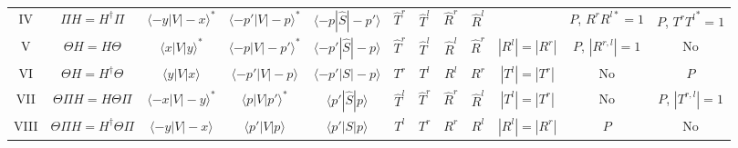 \begin{landscape}
\begin{table}
{\begin{tabular}{cccccccccccc}
      \\
      IV & $\Pi H=H^\dagger \Pi$ &  $\langle -y|V|-x\rangle^*$ & $\langle -p'|V|-p\rangle^*$ & $\langle -p|\widehat{S}|-p'\rangle$ & $\widehat{T}^r$ & $\widehat{T}^l$ & $\widehat{R}^r$ & $\widehat{R}^l$&&$P$, $R^rR^{l*}=1$&$P$, $T^r{T^l}^*=1$
      \\
      V & $\Theta H=H\Theta$ &  $\langle x|V|y\rangle^*$& $\langle -p|V|-p'\rangle^*$ & $\langle -p'|\widehat{S}|-p\rangle$ & $\widehat{T}^r$ & $\widehat{T}^l$ & $\widehat{R}^l$& $\widehat{R}^r$
      &$|R^l|=|R^r|$&$P$, $|R^{r,l}|=1$&No
      \\
      VI & $\Theta H=H^\dagger\Theta$ &  $\langle y|V|x\rangle$& $\langle -p'|V|-p\rangle$ & $\langle -p'|S|-p\rangle$ & $T^r$& $T^l$ & $R^l$& $R^r$&$|T^l| = |T^r|$&No&$P$
      \\
      VII & $\Theta\Pi H=H\Theta \Pi$ &  $\langle -x|V|-y\rangle^*$ & $\langle p|V|p'\rangle^*$ & $\langle p'|\widehat{S}|p\rangle$ &$\widehat{T}^l$& $\widehat{T}^r$ & $\widehat{R}^r$& $\widehat{R}^l$&$|T^l|=|T^r|$&No&$P$, $|T^{r,l}|=1$
      \\
      VIII& $\Theta\Pi H=H^\dagger \Theta \Pi$ &  $\langle -y|V|-x\rangle$ & $\langle p'|V|p\rangle$ & $\langle p'|S|p\rangle$ & $T^l$ & $T^r$ & $R^r$ & $R^l$&$|R^l|=|R^r|$&$P$&No
      \\
      \hline\hline
    \end{tabular}}
  \end{table}
\end{landscape}


